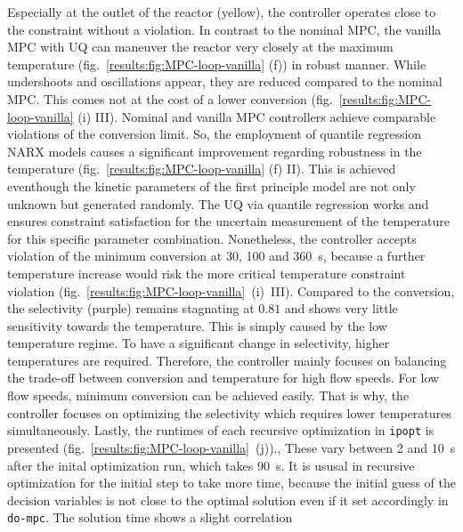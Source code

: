 Especially at the outlet of the reactor (yellow), the controller operates close to the constraint
without a violation. 
In contrast to the nominal MPC, the vanilla MPC with UQ
can maneuver the reactor very closely at the maximum temperature
(fig.~\ref{results:fig:MPC-loop-vanilla} (f)) in robust manner.
While undershoots and oscillations appear,
they are reduced compared to the nominal MPC. This comes not at the cost of a 
lower conversion (fig.~\ref{results:fig:MPC-loop-vanilla} (i) III). Nominal and vanilla
MPC controllers achieve comparable violations of the conversion limit. So, the employment 
of quantile regression NARX models causes a significant improvement regarding robustness in
the temperature (fig.~\ref{results:fig:MPC-loop-vanilla} (f) II).
This is achieved eventhough the kinetic
parameters of the first principle model are not only unknown but generated randomly.
The UQ via quantile regression works and ensures constraint satisfaction
for the uncertain measurement of the temperature for this specific parameter combination.
\newline
\newline
\noindent
Nonetheless, the controller accepts violation of the minimum conversion at \SI{30}{}, \SI{100}{}
and \SI{360}{\second}, because a further temperature increase would risk the more critical temperature
constraint violation (fig.~\ref{results:fig:MPC-loop-vanilla}~(i)~III). Compared to the conversion, the selectivity
(purple) remains stagnating at $0.81$ and shows very little sensitivity towards the temperature.
This is simply caused by the low temperature regime. To have a significant change in selectivity, higher
temperatures are required. Therefore, the controller mainly focuses on balancing the trade-off between
conversion and temperature for high flow speeds. For low flow speeds, minimum conversion can be achieved easily.
That is why, the controller focuses on optimizing the selectivity which requires lower temperatures 
simultaneously.
\newline
\newline
\noindent
Lastly, the runtimes of each recursive optimization in \texttt{ipopt} \cite{Waechter2006} is presented
(fig.~\ref{results:fig:MPC-loop-vanilla}~(j)).,
These vary between \SI{2}{} and \SI{10}{\second} after the inital optimization run, which takes
\SI{90}{\second}. It is ususal in recursive optimization for the initial step to take more 
time, because the initial guess of the decision variables is not close to the optimal solution
even if it set accordingly in \texttt{do-mpc}. The solution time shows a slight correlation
